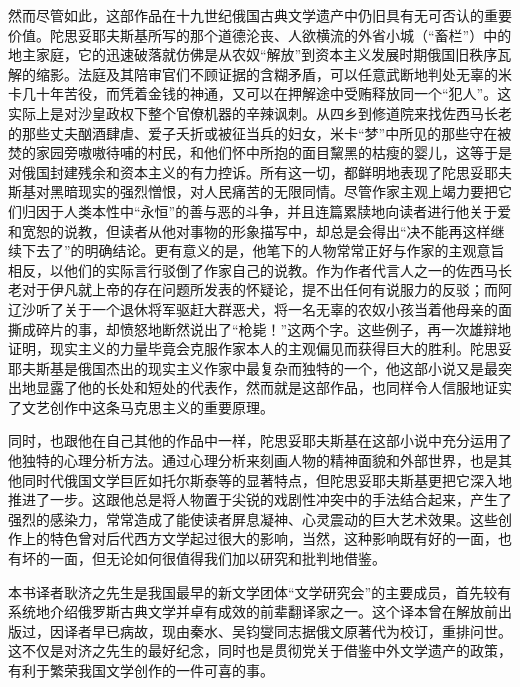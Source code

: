 \par 然而尽管如此，这部作品在十九世纪俄国古典文学遗产中仍旧具有无可否认的重要价值。陀思妥耶夫斯基所写的那个道德沦丧、人欲横流的外省小城（“畜栏”）中的地主家庭，它的迅速破落就仿佛是从农奴“解放”到资本主义发展时期俄国旧秩序瓦解的缩影。法庭及其陪审官们不顾证据的含糊矛盾，可以任意武断地判处无辜的米卡几十年苦役，而凭着金钱的神通，又可以在押解途中受贿释放同一个“犯人”。这实际上是对沙皇政权下整个官僚机器的辛辣讽刺。从四乡到修道院来找佐西马长老的那些丈夫酗酒肆虐、爱子夭折或被征当兵的妇女，米卡“梦”中所见的那些守在被焚的家园旁嗷嗷待哺的村民，和他们怀中所抱的面目黧黑的枯瘦的婴儿，这等于是对俄国封建残余和资本主义的有力控诉。所有这一切，都鲜明地表现了陀思妥耶夫斯基对黑暗现实的强烈憎恨，对人民痛苦的无限同情。尽管作家主观上竭力要把它们归因于人类本性中“永恒”的善与恶的斗争，并且连篇累牍地向读者进行他关于爱和宽恕的说教，但读者从他对事物的形象描写中，却总是会得出“决不能再这样继续下去了”的明确结论。更有意义的是，他笔下的人物常常正好与作家的主观意旨相反，以他们的实际言行驳倒了作家自己的说教。作为作者代言人之一的佐西马长老对于伊凡就上帝的存在问题所发表的怀疑论，提不出任何有说服力的反驳；而阿辽沙听了关于一个退休将军驱赶大群恶犬，将一名无辜的农奴小孩当着他母亲的面撕成碎片的事，却愤怒地断然说出了“枪毙！”这两个字。这些例子，再一次雄辩地证明，现实主义的力量毕竟会克服作家本人的主观偏见而获得巨大的胜利。陀思妥耶夫斯基是俄国杰出的现实主义作家中最复杂而独特的一个，他这部小说又是最突出地显露了他的长处和短处的代表作，然而就是这部作品，也同样令人信服地证实了文艺创作中这条马克思主义的重要原理。
\par 同时，也跟他在自己其他的作品中一样，陀思妥耶夫斯基在这部小说中充分运用了他独特的心理分析方法。通过心理分析来刻画人物的精神面貌和外部世界，也是其他同时代俄国文学巨匠如托尔斯泰等的显著特点，但陀思妥耶夫斯基更把它深入地推进了一步。这跟他总是将人物置于尖锐的戏剧性冲突中的手法结合起来，产生了强烈的感染力，常常造成了能使读者屏息凝神、心灵震动的巨大艺术效果。这些创作上的特色曾对后代西方文学起过很大的影响，当然，这种影响既有好的一面，也有坏的一面，但无论如何很值得我们加以研究和批判地借鉴。
\par 本书译者耿济之先生是我国最早的新文学团体“文学研究会”的主要成员，首先较有系统地介绍俄罗斯古典文学并卓有成效的前辈翻译家之一。这个译本曾在解放前出版过，因译者早已病故，现由秦水、吴钧燮同志据俄文原著代为校订，重排问世。这不仅是对济之先生的最好纪念，同时也是贯彻党关于借鉴中外文学遗产的政策，有利于繁荣我国文学创作的一件可喜的事。
\par {}
\par {}


